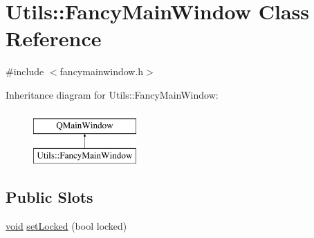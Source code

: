 \hypertarget{class_utils_1_1_fancy_main_window}{\section{Utils\-:\-:Fancy\-Main\-Window Class Reference}
\label{class_utils_1_1_fancy_main_window}
}


{\ttfamily \#include $<$fancymainwindow.\-h$>$}

Inheritance diagram for Utils\-:\-:Fancy\-Main\-Window\-:\begin{figure}[H]
\begin{center}
\leavevmode
\includegraphics[height=2.000000cm]{class_utils_1_1_fancy_main_window}
\end{center}
\end{figure}
\subsection*{Public Slots}
\begin{DoxyCompactItemize}
\item 
\hyperlink{group___u_a_v_objects_plugin_ga444cf2ff3f0ecbe028adce838d373f5c}{void} \hyperlink{class_utils_1_1_fancy_main_window_a4158149be21439e3eddf430c7dab6bb1}{set\-Locked} (bool locked)
\end{DoxyCompactItemize}
